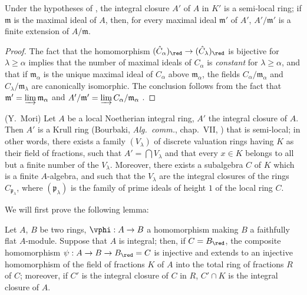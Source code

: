 \begin{corollary}[23.2.6]
\label{0.23.2.6}
Under the hypotheses of , the integral closure $A'$ of $A$ in $K'$ is a semi-local ring; if $\mathfrak{m}$ is the maximal ideal of $A$, then, for every maximal ideal $\mathfrak{m}'$ of $A'$, $A'/\mathfrak{m}'$ is a finite extension of $A/\mathfrak{m}$.
\end{corollary}

\begin{proof}
The fact that the homomorphism $(\hat{C}_\alpha)_\red\to(\hat{C}_\lambda)_\red$ is bijective for $\lambda\geq\alpha$ implies that the number of maximal ideals of $C_\alpha$ is \emph{constant} for $\lambda\geq\alpha$, and that if $\mathfrak{m}_\alpha$ is the unique maximal ideal of $C_\alpha$ above $\mathfrak{m}_\alpha$, the fields $C_\alpha/\mathfrak{m}_\alpha$ and $C_\lambda/\mathfrak{m}_\lambda$ are canonically isomorphic.
The conclusion follows from the fact that $\mathfrak{m}'=\varinjlim\mathfrak{m}_\alpha$ and $A'/\mathfrak{m}'=\varinjlim C_\alpha/\mathfrak{m}_\alpha$ .
\end{proof}

\begin{proposition}[23.2.7]
\label{0.23.2.7}
\textnormal{(Y.~Mori)}
Let $A$ be a local Noetherian integral ring, $A'$ the integral closure of $A$.
Then $A'$ is a Krull ring \textnormal{(Bourbaki, \emph{Alg.~comm.}, chap.~VII, )} that is semi-local; in other words, there exists a family $(V_\lambda)$ of discrete valuation rings having $K$ as their field of fractions, such that $A'=\bigcap V_\lambda$ and that every $x\in K$ belongs to all but a finite number of the $V_\lambda$.
Moreover, there exists a subalgebra $C$ of $K$ which is a finite $A$-algebra, and such that the $V_\lambda$ are the integral closures of the rings $C_{\mathfrak{p}_\lambda}$, where $(\mathfrak{p}_\lambda)$ is the family of prime ideals of height $1$ of the local ring $C$.
\end{proposition}

We will first prove the following lemma:

\begin{lemma}[23.2.7.1]
\label{0.23.2.7.1}
Let $A$, $B$ be two rings, $\vphi:A\to B$ a homomorphism making $B$ a faithfully flat $A$-module.
Suppose that $A$ is integral; then, if $C=B_\red$, the composite homomorphism $\psi:A\to B\to B_\red=C$ is injective and extends to an injective homomorphism of the field of fractions $K$ of $A$ into the total ring of fractions $R$ of $C$; moreover, if $C'$ is the integral closure of $C$ in $R$, $C'\cap K$ is the integral closure of $A$.
\end{lemma}

